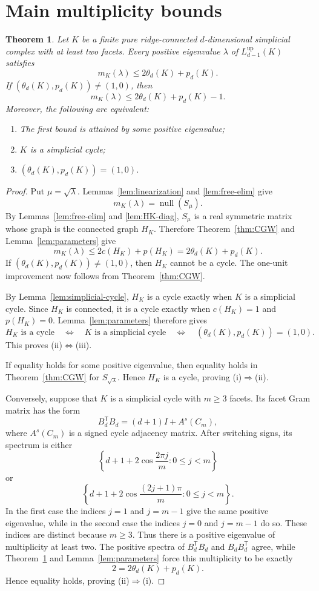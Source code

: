 \documentclass[12pt]{article}
\newtheorem{theorem}{Theorem}
\theoremstyle{remark}
\newcommand{\nullity}{\operatorname{null}}
\begin{document}
\section{Main multiplicity bounds}

\begin{theorem}\label{thm:main-p}
Let $K$ be a finite pure ridge-connected $d$-dimensional simplicial complex with at least two facets.  Every positive eigenvalue $\lambda$ of $L^{\mathrm{up}}_{d-1}(K)$ satisfies
\[
m_K(\lambda)\le2\theta_d(K)+p_d(K).
\]
If $(\theta_d(K),p_d(K))\ne(1,0)$, then
\[
m_K(\lambda)\le2\theta_d(K)+p_d(K)-1.
\]
Moreover, the following are equivalent:
\begin{enumerate}
\item[(i)] The first bound is attained by some positive eigenvalue;
\item[(ii)] $K$ is a simplicial cycle;
\item[(iii)] $(\theta_d(K),p_d(K))=(1,0)$.
\end{enumerate}
\end{theorem}

\begin{proof}
Put $\mu=\sqrt\lambda$.  Lemmas~\ref{lem:linearization} and \ref{lem:free-elim} give
\[
m_K(\lambda)=\nullity(S_\mu).
\]
By Lemmas~\ref{lem:free-elim} and \ref{lem:HK-diag}, $S_\mu$ is a real symmetric matrix whose graph is the connected graph $H_K$.  Therefore Theorem~\ref{thm:CGW} and Lemma~\ref{lem:parameters} give
\[
m_K(\lambda)\le2c(H_K)+p(H_K)
=2\theta_d(K)+p_d(K).
\]
If $(\theta_d(K),p_d(K))\ne(1,0)$, then $H_K$ cannot be a cycle.  The one-unit improvement now follows from Theorem~\ref{thm:CGW}.

By Lemma~\ref{lem:simplicial-cycle}, $H_K$ is a cycle exactly when $K$ is a simplicial cycle.  Since $H_K$ is connected, it is a cycle exactly when $c(H_K)=1$ and $p(H_K)=0$.  Lemma~\ref{lem:parameters} therefore gives
\[
H_K\text{ is a cycle}
\quad\Longleftrightarrow\quad
K\text{ is a simplicial cycle}
\quad\Longleftrightarrow\quad
(\theta_d(K),p_d(K))=(1,0).
\]
This proves (ii)$\Longleftrightarrow$(iii).

If equality holds for some positive eigenvalue, then equality holds in Theorem~\ref{thm:CGW} for $S_{\sqrt\lambda}$.  Hence $H_K$ is a cycle, proving (i)$\Rightarrow$(ii).

Conversely, suppose that $K$ is a simplicial cycle with $m\ge3$ facets.  Its facet Gram matrix has the form
\[
B_d^{\mathsf T}B_d=(d+1)I+A^s(C_m),
\]
where $A^s(C_m)$ is a signed cycle adjacency matrix.  After switching signs, its spectrum is either
\[
\left\{d+1+2\cos\frac{2\pi j}{m}:0\le j<m\right\}
\]
or
\[
\left\{d+1+2\cos\frac{(2j+1)\pi}{m}:0\le j<m\right\}.
\]
In the first case the indices $j=1$ and $j=m-1$ give the same positive eigenvalue, while in the second case the indices $j=0$ and $j=m-1$ do so.  These indices are distinct because $m\ge3$.  Thus there is a positive eigenvalue of multiplicity at least two.  The positive spectra of $B_d^{\mathsf T}B_d$ and $B_dB_d^{\mathsf T}$ agree, while Theorem~\ref{thm:main-p} and Lemma~\ref{lem:parameters} force this multiplicity to be exactly
\[
2=2\theta_d(K)+p_d(K).
\]
Hence equality holds, proving (ii)$\Rightarrow$(i).
\end{proof}
\end{document}
